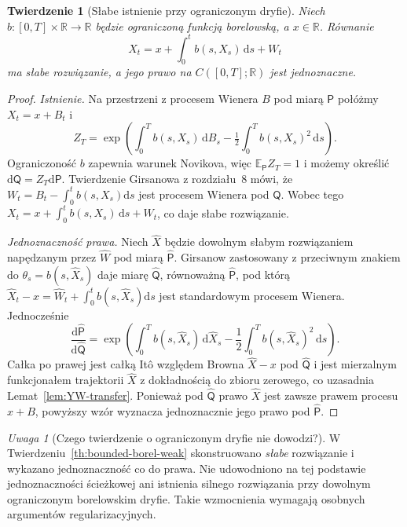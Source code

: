 \documentclass[11pt,a4paper,oneside]{report}
\numberwithin{equation}{chapter}
\theoremstyle{plain}
\newtheorem{twierdzenie}{Twierdzenie}[chapter]
\theoremstyle{definition}
\theoremstyle{remark}
\newtheorem{uwaga}{Uwaga}[chapter]
\newcommand{\R}{\mathbb{R}}
\newcommand{\E}{\mathbb{E}}
\newcommand{\dd}{\mathrm{d}}
\begin{document}
\begin{twierdzenie}[Słabe istnienie przy ograniczonym dryfie]\label{thm:volIII:14:02}
\label{th:bounded-borel-weak}
Niech $b:[0,T]\times\R\to\R$ będzie ograniczoną funkcją
borelowską, a $x\in\R$. Równanie
\[
 X_t=x+\int_0^t b(s,X_s)\,\dd s+W_t
 \tag{14.2}\label{eq:borel-drift}
\]
ma słabe rozwiązanie, a jego prawo na $C([0,T];\R)$
jest jednoznaczne.
\end{twierdzenie}
\begin{proof}
\emph{Istnienie.} Na przestrzeni z procesem Wienera $B$
pod miarą $\mathsf P$ połóżmy $X_t=x+B_t$ i
\[
 Z_T=\exp\left(\int_0^Tb(s,X_s)\,\dd B_s
 -\tfrac12\int_0^Tb(s,X_s)^2\,\dd s\right).
\]
Ograniczoność $b$ zapewnia warunek Novikova,
więc $\E_{\mathsf P}Z_T=1$ i możemy określić
$\dd\mathsf Q=Z_T\dd\mathsf P$.
Twierdzenie Girsanowa z rozdziału~8 mówi, że
$W_t=B_t-\int_0^tb(s,X_s)\dd s$ jest
procesem Wienera pod $\mathsf Q$.
Wobec tego $X_t=x+\int_0^t b(s,X_s)\,\dd s+W_t$,
co daje słabe rozwiązanie.

\emph{Jednoznaczność prawa.} Niech $\widehat X$ będzie
dowolnym słabym rozwiązaniem napędzanym przez
$\widehat W$ pod miarą $\widehat{\mathsf P}$.
Girsanow zastosowany z przeciwnym znakiem do
$\theta_s=b(s,\widehat X_s)$ daje miarę
$\widehat{\mathsf Q}$, równoważną
$\widehat{\mathsf P}$, pod którą
$\widehat X_t-x=\widehat W_t+
\int_0^tb(s,\widehat X_s)\dd s$ jest
standardowym procesem Wienera. Jednocześnie
\[
 \frac{\dd\widehat{\mathsf P}}{\dd\widehat{\mathsf Q}}
 =\exp\left(\int_0^T b(s,\widehat X_s)\,\dd\widehat X_s
 -\frac12\int_0^Tb(s,\widehat X_s)^2\,\dd s\right).
\]
Całka po prawej jest całką Itô względem Browna
$\widehat X-x$ pod $\widehat{\mathsf Q}$ i jest
mierzalnym funkcjonałem trajektorii $\widehat X$
z dokładnością do zbioru zerowego, co uzasadnia
Lemat~\ref{lem:YW-transfer}. Ponieważ pod
$\widehat{\mathsf Q}$ prawo $\widehat X$ jest zawsze
prawem procesu $x+B$, powyższy wzór wyznacza jednoznacznie
jego prawo pod $\widehat{\mathsf P}$.
\end{proof}

\begin{uwaga}[Czego twierdzenie o ograniczonym dryfie nie dowodzi?]
W Twierdzeniu~\ref{th:bounded-borel-weak} skonstruowano
\emph{słabe} rozwiązanie i wykazano jednoznaczność co do
prawa. Nie udowodniono na tej podstawie jednoznaczności
ścieżkowej ani istnienia silnego rozwiązania przy dowolnym
ograniczonym borelowskim dryfie. Takie wzmocnienia wymagają
osobnych argumentów regularizacyjnych.
\end{uwaga}
\end{document}

